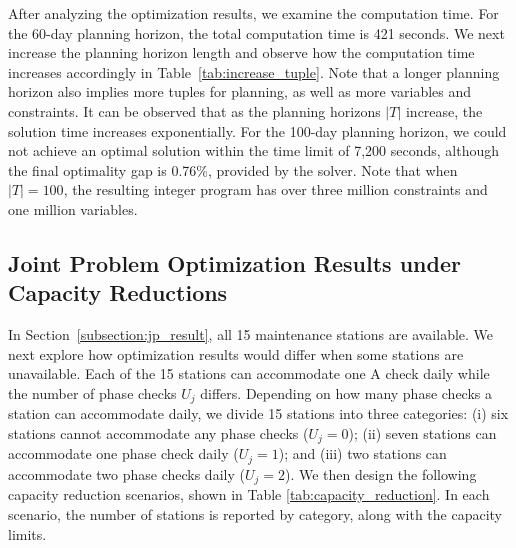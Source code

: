 After analyzing the optimization results, we examine the computation time. For the 60-day planning horizon, the total computation time is 421 seconds. We next increase the planning horizon length and observe how the computation time increases accordingly in Table~\ref{tab:increase_tuple}. Note that a longer planning horizon also implies more tuples for planning, as well as more variables and constraints. It can be observed that as the planning horizons $|T|$ increase, the solution time increases exponentially. For the 100-day planning horizon, we could not achieve an optimal solution within the time limit of 7,200 seconds, although the final optimality gap is 0.76\%, provided by the solver. Note that when $|T| = 100$, the resulting integer program has over three million constraints and one million variables.




\begin{table}[htbp]
\centering
\caption{Effect of planning horizon length $|T|$ on computation time}
\label{tab:increase_tuple}
\end{table}



\subsection{Joint Problem Optimization Results under Capacity Reductions}
\label{subsection:jp_resultReducedCap}
In Section~\ref{subsection:jp_result}, all 15 maintenance stations are available. We next explore how optimization results would differ when some stations are unavailable. Each of the 15 stations can accommodate one A check daily while the number of phase checks $U_j$ differs. Depending on how many phase checks a station can accommodate daily, we divide 15 stations into three categories: (i) six stations cannot accommodate any phase checks ($U_j = 0$); (ii) seven stations can accommodate one phase check daily ($U_j = 1$); and (iii) two stations can accommodate two phase checks daily ($U_j = 2$). We then design the following capacity reduction scenarios, shown in Table \ref{tab:capacity_reduction}. In each scenario, the number of stations is reported by category, along with the capacity limits.

